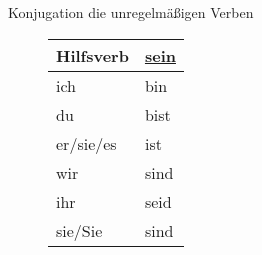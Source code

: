 \begin{syntax}{Konjugation die unregelmäßigen Verben}{}
\begin{figure}[H]
\centering
\begin{tabular}{|l|l|}
	\hline
	Hilfsverb & \href{https://de.wiktionary.org/wiki/Flexion:sein}{sein} \\
	\hline
	ich & bin \\
	du & bist \\
	er/sie/es & ist \\
	wir & sind \\
	ihr & seid \\
	sie/Sie & sind \\
	\hline
\end{tabular}
\end{figure}
\end{syntax}
